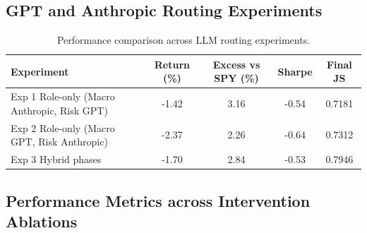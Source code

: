 \documentclass{article}
\begin{document}
\subsection{GPT and Anthropic Routing Experiments}
\label{app:llm_routing_experiments}

\begin{table}[H]
\centering
\begin{tabular}{lcccc}
\hline
\textbf{Experiment} & \textbf{Return (\%)} & \textbf{Excess vs SPY (\%)} & \textbf{Sharpe} & \textbf{Final JS} \\
\hline
Exp 1 Role-only (Macro Anthropic, Risk GPT) & -1.42 & 3.16 & -0.54 & 0.7181 \\
Exp 2 Role-only (Macro GPT, Risk Anthropic) & -2.37 & 2.26 & -0.64 & 0.7312 \\
Exp 3 Hybrid phases & -1.70 & 2.84 & -0.53 & 0.7946 \\
\hline
\end{tabular}
\vspace{4pt}
\caption{Performance comparison across LLM routing experiments.}
\label{tab:llm_routing_experiments}
\end{table}

\subsection{Performance Metrics across Intervention Ablations}
\label{app:financial-results}
\end{document}
